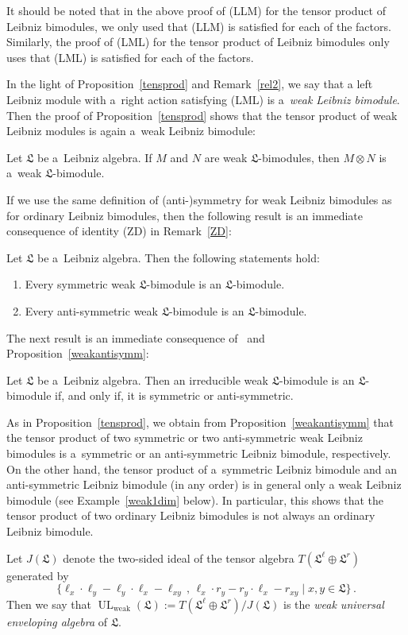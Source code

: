 \documentclass{jonasart}
\DeclareMathOperator{\UL}{UL}
\DeclareMathOperator{\weak}{weak}
\newcommand{\lf}{\mathfrak{L}}
\begin{document}
	\begin{remark}\label{rel2}
		{It should be noted that in the above proof of (LLM) for the tensor product of Leibniz bimodules, we only used that (LLM) is satisfied for each of the factors. Similarly, the proof of (LML) for the tensor product of Leibniz bimodules only uses that (LML) is satisfied for each of the factors.}
	\end{remark}
	In the light of Proposition~\ref{tensprod} and Remark~\ref{rel2}, we say that a left Leibniz module with a~right action satisfying (LML) is a~\emph{weak Leibniz bimodule\/}. Then the proof of Proposition~\ref{tensprod} shows that the tensor product of weak Leibniz modules is again a~weak Leibniz bimodule:
	\begin{proposition}
		Let $\lf$ be a~Leibniz algebra. If $M$ and $N$ are weak $\lf$-bimodules, then $M\otimes N$ is a~weak $\lf$-bimodule.
	\end{proposition}
	If we use the same definition of (anti-)symmetry for weak Leibniz bimodules as for ordinary Leibniz bimodules, then the following result is an immediate consequence of identity (ZD) in Remark~\ref{ZD}:
	\begin{proposition}\label{weakantisymm}
		Let $\lf$ be a~Leibniz algebra. Then the following statements hold:
		\begin{enumerate}
			\item[\textrm{(a)}] Every symmetric weak $\lf$-bimodule is an $\lf$-bimodule.
			\item[\textrm{(b)}] Every anti-symmetric weak $\lf$-bimodule is an $\lf$-bimodule.
		\end{enumerate}
	\end{proposition}
	The next result is an immediate consequence of~\cite[Theorem 3.14]{F1}
	and Proposition~\ref{weakantisymm}:
	\begin{corollary}\label{weakantisymmirred}
		Let $\lf$ be a~Leibniz algebra. Then an irreducible weak $\lf$-bimodule is an $\lf$-bimodule if, and only if, it is symmetric or anti-symmetric.
	\end{corollary}

	\begin{remark}
	   As in Proposition~\ref{tensprod}, we obtain from Proposition~\ref{weakantisymm} that the tensor product of two symmetric or two anti-symmetric weak Leibniz bimodules is a~symmetric or an anti-symmetric Leibniz bimodule, respectively. On the other hand, the tensor product of a~symmetric Leibniz bimodule and an anti-symmetric Leibniz bimodule (in any order) is in general only a weak Leibniz bimodule (see Example~\ref{weak1dim} below). In particular, this shows that the tensor product of two ordinary
		Leibniz bimodules is not always an ordinary Leibniz bimodule.
	\end{remark}
	Let $J(\lf)$ denote the two-sided ideal of the tensor algebra $T(\lf^\ell
	\oplus\lf^r )$ generated by
	\[
		\{\ell_x\cdot\ell_y -\ell_y\cdot\ell_x -\ell_{xy}\,,\,\ell_x\cdot r_y -r_y\cdot
		\ell_x -r_{xy}\mid x,y\in\lf\}\,.
	\]
	Then we say that $\UL_{\weak}(\lf):=T(\lf^\ell\oplus\lf^r )/J(\lf)$ is the
	\emph{weak universal enveloping algebra\/} of $\lf$.
\end{document}
